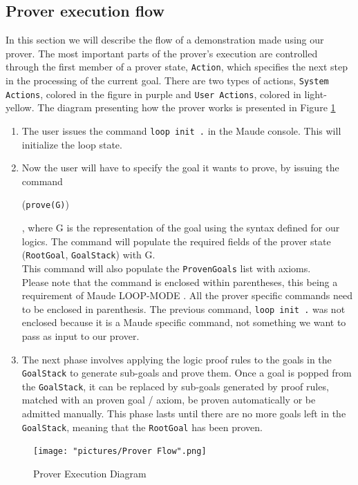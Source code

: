 \documentclass[12pt,a4paper]{article}
\begin{document}
{\subsection{Prover execution flow}
In this section we will describe the flow of a demonstration made using our prover. The most important parts of the prover's execution are controlled through the first member of a prover state, \texttt{Action}, which specifies the next step in the processing of the current goal. There are two types of actions, \texttt{System Actions}, colored in the figure in purple and \texttt{User Actions}, colored in light-yellow. The diagram presenting how the prover works is presented in Figure \ref{fig:ProverDiagram}
\\
\begin{enumerate}
	\item The user issues the command \texttt{loop init .} in the Maude console. This will initialize the loop state.
	\item Now the user will have to specify the goal it wants to prove, by issuing the command \begin{center}(\texttt{prove(G)})\end{center}, where G is the representation of the goal using the syntax defined for our logics. The command will populate the required fields of the prover state (\texttt{RootGoal}, \texttt{GoalStack}) with G.
	\\
	
	This command will also populate the \texttt{ProvenGoals} list with axioms.
	\\
	
	Please note that the command is enclosed within parentheses, this being a requirement of Maude LOOP-MODE \cite{manual}. All the prover specific commands need to be enclosed in parenthesis. The previous command, \texttt{loop init .} was not enclosed because it is a Maude specific command, not something we want to pass as input to our prover.
	\item The next phase involves applying the logic proof rules to the goals in the \texttt{GoalStack} to generate sub-goals and prove them. Once a goal is popped from the \texttt{GoalStack}, it can be replaced by sub-goals generated by proof rules, matched with an proven goal / axiom, be proven automatically or be admitted manually. This phase lasts until there are no more goals left in the \texttt{GoalStack}, meaning that the \texttt{RootGoal} has been proven.
\end{enumerate}
\begin{figure}[h]
	\texttt{[image: "pictures/Prover Flow".png]}
	\caption{Prover Execution Diagram}
	\label{fig:ProverDiagram}
\end{figure} 
}
\end{document}
